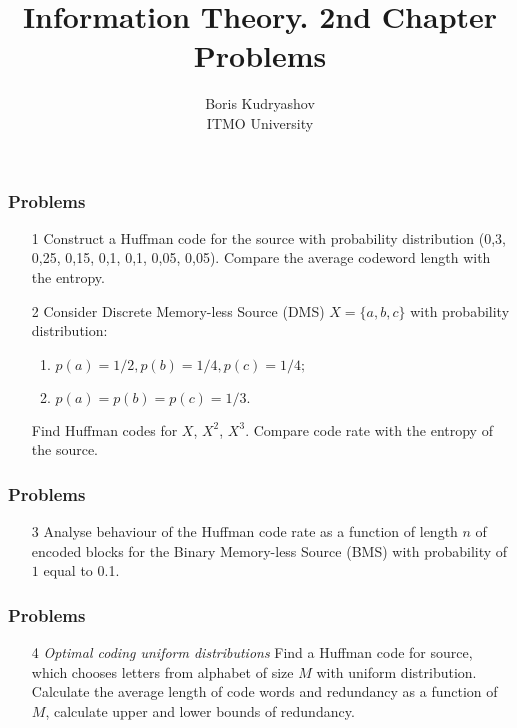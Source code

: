\documentclass[14pt]{beamer}
\title{\small{Information Theory. 2nd Chapter Problems}}
\author{\huge{
Boris Kudryashov \\
\vspace{30pt}
ITMO University
}}
\begin{document}
\maketitle

\begin{frame}
\frametitle{Problems}
\begin{enumerate}
  \item[1] Construct a  Huffman code for the source with probability distribution (0,3, 0,25, 0,15, 0,1, 0,1, 0,05, 0,05). Compare the average codeword length with the entropy.
  \pause \item[2] Consider Discrete Memory-less Source (DMS) $X = \{a, b, c\}$ with probability distribution: 
    \begin{enumerate}
    \item
    $p\left( a \right) = 1/2,p\left( b\right) = 1/4,p\left(c\right)=1/4;$
    \item
    $p\left( a \right) = p\left( b \right) = p\left( c \right) = 1 / 3.$
    \end{enumerate}
  Find Huffman codes for $X$, $X^{2}$, $X^{3}$. Compare code rate with the entropy of the source.
\end{enumerate}
\end{frame}


\begin{frame}
\frametitle{Problems}
\begin{enumerate}

  \item[3] Analyse behaviour of the Huffman code rate as a function of length $n$ of encoded blocks for the Binary Memory-less Source (BMS) with probability of $1$ equal to 0.1.
 
\end{enumerate}
\end{frame}


\begin{frame}
\frametitle{Problems}
\begin{enumerate}

  \item[4] \emph{Optimal coding uniform distributions} 
  Find a Huffman code for source, which chooses letters from alphabet of size $M$ with uniform distribution. Calculate the average length of code words and redundancy as a function of $M$, calculate upper and lower bounds of redundancy.
  
  \end{enumerate}
\end{frame}
\end{document}
